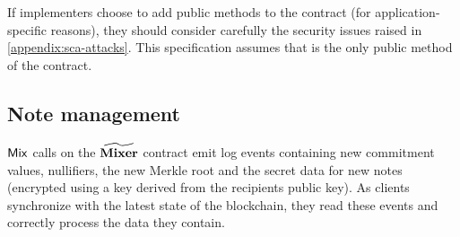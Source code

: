 If implementers choose to add public methods to the \mixer{} contract (for application-specific reasons), they should consider carefully the security issues raised in \cref{appendix:sca-attacks}. This specification assumes that \mix{} is the only public method of the \mixer{} contract.

\subsection{Note management}\label{client-security:syncing:note-management}

$\mathsf{Mix}$ calls on the $\widetilde{\mathbf{Mixer}}$ contract emit log events containing new commitment values, nullifiers, the new Merkle root and the secret data for new notes (encrypted using a key derived from the recipients public key). As clients synchronize with the latest state of the blockchain, they \MUST{} read these events and correctly process the data they contain.

